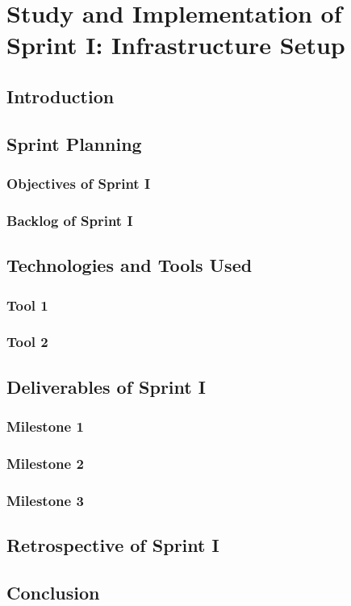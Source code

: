 \documentclass[a4paper,12pt]{report}
\begin{document}
\chapter{Study and Implementation of Sprint I: Infrastructure Setup}

\section{Introduction}
\section{Sprint Planning}
\subsection{Objectives of Sprint I}
\subsection{Backlog of Sprint I}
\section{Technologies and Tools Used}
\subsection{Tool 1}
\subsection{Tool 2}
\section{Deliverables of Sprint I}
\subsection{Milestone 1}
\subsection{Milestone 2}
\subsection{Milestone 3}
\section{Retrospective of Sprint I}
\section{Conclusion}
\end{document}
